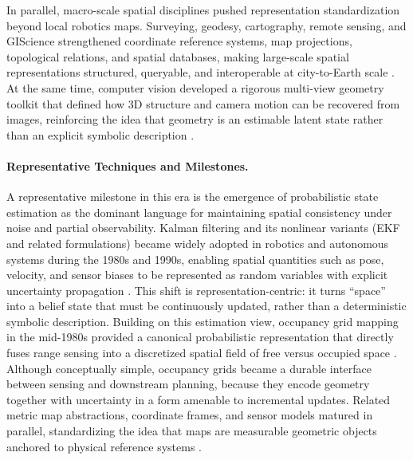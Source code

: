 In parallel, macro-scale spatial disciplines pushed representation standardization beyond local robotics maps.
Surveying, geodesy, cartography, remote sensing, and GIScience strengthened coordinate reference systems, map projections, topological relations, and spatial databases, making large-scale spatial representations structured, queryable, and interoperable at city-to-Earth scale \cite{goodchild1992geographical}.
At the same time, computer vision developed a rigorous multi-view geometry toolkit that defined how 3D structure and camera motion can be recovered from images, reinforcing the idea that geometry is an estimable latent state rather than an explicit symbolic description \cite{hartley2003multiple}.





\paragraph{Representative Techniques and Milestones.}
A representative milestone in this era is the emergence of probabilistic state estimation as the dominant language for maintaining spatial consistency under noise and partial observability.
Kalman filtering and its nonlinear variants (EKF and related formulations) became widely adopted in robotics and autonomous systems during the 1980s and 1990s, enabling spatial quantities such as pose, velocity, and sensor biases to be represented as random variables with explicit uncertainty propagation \cite{welch1995kalman}.
This shift is representation-centric: it turns ``space'' into a belief state that must be continuously updated, rather than a deterministic symbolic description.
Building on this estimation view, occupancy grid mapping in the mid-1980s provided a canonical probabilistic representation that directly fuses range sensing into a discretized spatial field of free versus occupied space \cite{Moravec1985SonarMaps,Thrun2005Probabilistic}.
Although conceptually simple, occupancy grids became a durable interface between sensing and downstream planning, because they encode geometry together with uncertainty in a form amenable to incremental updates.
Related metric map abstractions, coordinate frames, and sensor models matured in parallel, standardizing the idea that maps are measurable geometric objects anchored to physical reference systems \cite{LaValle2006Planning,hornung2013octomap}.


